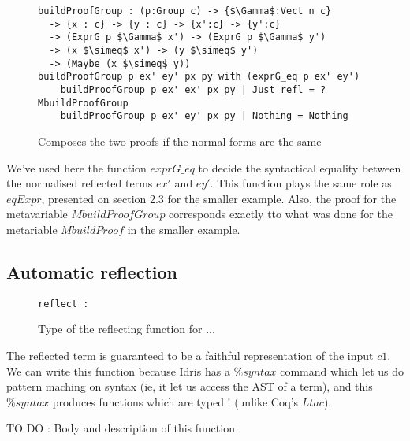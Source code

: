 \begin{figure}[H]
\figrule
\begin{center}
\begin{lstlisting}
buildProofGroup : (p:Group c) -> {$\Gamma$:Vect n c} 
  -> {x : c} -> {y : c} -> {x':c} -> {y':c} 
  -> (ExprG p $\Gamma$ x') -> (ExprG p $\Gamma$ y') 
  -> (x $\simeq$ x') -> (y $\simeq$ y') 
  -> (Maybe (x $\simeq$ y))
buildProofGroup p ex' ey' px py with (exprG_eq p ex' ey')
    buildProofGroup p ex' ex' px py | Just refl = ?MbuildProofGroup
    buildProofGroup p ex' ey' px py | Nothing = Nothing
\end{lstlisting}
\end{center}
\caption{Composes the two proofs if the normal forms are the same}
\figrule
\end{figure}
We've used here the function $exprG\_eq$ to decide the syntactical equality between the normalised reflected terms $ex'$ and $ey'$. This function plays the same role as $eqExpr$, presented on section 2.3 for the smaller example. Also, the proof for the metavariable $MbuildProofGroup$ corresponds exactly tto what was done for the metariable $MbuildProof$ in the smaller example.


\subsection {Automatic reflection}

\begin{figure}[H]
\figrule
\begin{center}
\begin{lstlisting}
reflect : 
\end{lstlisting}
\end{center}
\caption{Type of the reflecting function for ...}
\figrule
\end{figure}

The reflected term is guaranteed to be a faithful representation of the input $c1$. We can write this function because Idris has a $\%syntax$ command which let us do pattern maching on syntax (ie, it let us access the AST of a term), and this $\%syntax$ produces functions which are typed ! (unlike Coq's $Ltac$). 

TO DO : Body and description of this function









